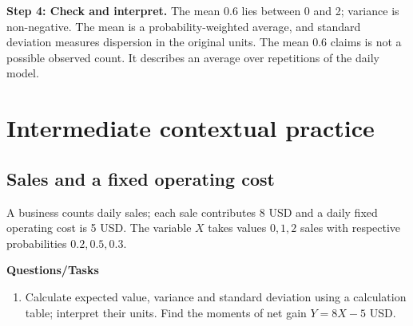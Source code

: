 \par\noindent\begin{minipage}{\linewidth}
\textbf{Step 4: Check and interpret.} The mean 0.6 lies between 0 and 2; variance is non-negative. The mean is a probability-weighted average, and standard deviation measures dispersion in the original units. The mean 0.6 claims is not a possible observed count. It describes an average over repetitions of the daily model.
\end{minipage}\par\medskip
{}
\section{Intermediate contextual practice}\label{sec:t2-c8-intermediate}
\subsection{Sales and a fixed operating cost}
A business counts daily sales; each sale contributes 8 USD and a daily fixed operating cost is 5 USD. The variable $X$ takes values $ 0, 1, 2$ sales with respective probabilities $ 0.2, 0.5, 0.3$.

\textbf{Questions/Tasks}
\begin{enumerate}
\item Calculate expected value, variance and standard deviation using a calculation table; interpret their units. Find the moments of net gain $Y=8X-5$ USD.
\end{enumerate}
